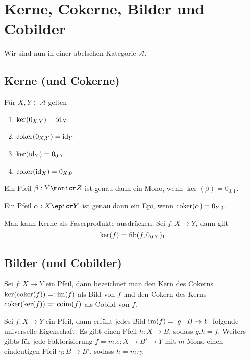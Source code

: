 \section{Kerne, Cokerne, Bilder und Cobilder}

Wir sind nun in einer abelschen Kategorie $\mathcal A$.

\subsection{Kerne (und Cokerne)}


\begin{prop}
Für $X,Y \in \mathcal A$ gelten
\begin{enumerate}
\item $\ker(0_{X,Y}) = \operatorname{id}_X$
\item $\operatorname{coker}(0_{X,Y}) = \operatorname{id}_Y$
\item $\ker(\operatorname{id}_Y) = 0_{0,Y}$
\item $\operatorname{coker}(\operatorname{id}_X) = 0_{X,0}$
\end{enumerate}
\end{prop}

\begin{prop}
Ein Pfeil $\beta : Y \monicr Z$ ist genau dann ein Mono, wenn $\ker(\beta) = 0_{0,Y}$.

Ein Pfeil $\alpha : X \epicr Y$ ist genau dann ein Epi, wenn $\operatorname{coker}(\alpha) = 0_{Y,0}$.
\end{prop}

\begin{prop}
Man kann Kerne als Faserprodukte ausdrücken. Sei $f : X\to Y$, dann gilt
\[\ker(f) = \operatorname{fib}(f,0_{0,Y})_1 \]
\end{prop}

\subsection{Bilder (und Cobilder)}

\begin{defn}
Sei $f : X\to Y$ ein Pfeil, dann bezeichnet man den Kern des Cokerns $\ker(\operatorname{coker}(f)) =: \operatorname{im}(f)$ als Bild von $f$
und den Cokern des Kerns $\operatorname{coker}(\ker(f)) =: \operatorname{coim}(f)$ als Cobild von $f$.
\end{defn}

\begin{prop}
Sei $f:X\to Y$ ein Pfeil, dann erfüllt jedes Bild $\operatorname{im}(f) =: g : B \to Y$ folgende universelle Eigenschaft:
Es gibt einen Pfeil $h : X \to B$, sodass $g.h = f$. Weiters gibts für jede Faktorisierung $f = m . e : X \to B' \to Y$ mit $m$ Mono einen eindeutigen Pfeil $\gamma : B \to B'$, sodass $h = m.\gamma$.
\end{prop}


